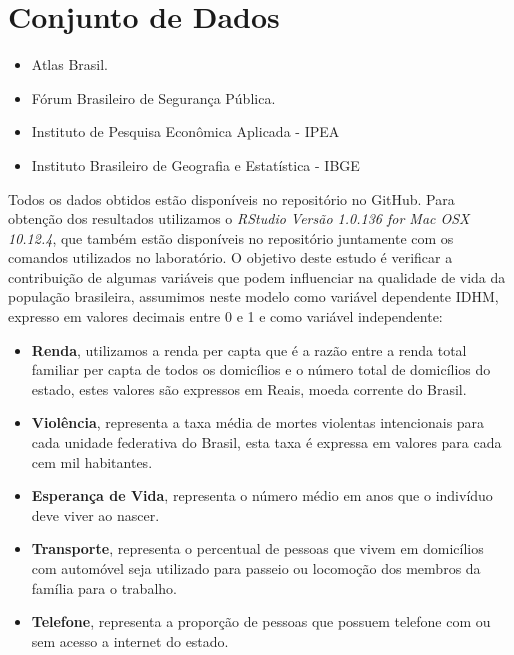 \documentclass[10pt,foldmark,notumble]{leaflet}
\begin{document}
\pagebreak

\section{Conjunto de Dados}

\begin{itemize}
			\item Atlas Brasil.
            \item Fórum Brasileiro de Segurança Pública.
            \item Instituto de Pesquisa Econômica Aplicada - IPEA
            \item Instituto Brasileiro de Geografia e Estatística - IBGE
		\end{itemize} 
        

Todos os dados obtidos estão disponíveis no repositório\cite{RepoIgor2017} no GitHub. Para obtenção dos resultados utilizamos o \emph{RStudio Versão 1.0.136 for Mac OSX 10.12.4}, que também estão disponíveis no repositório\cite{RepoIgor2017} juntamente com os comandos utilizados no laboratório. O objetivo deste estudo é verificar a contribuição de algumas variáveis que podem influenciar na qualidade de vida da população brasileira, assumimos neste modelo como variável dependente IDHM, expresso em valores decimais entre 0 e 1 e como variável independente:

\begin{itemize}
\item {\textbf{Renda}, utilizamos a renda per capta que é a razão entre a renda total familiar per capta de todos os domicílios e o número total de domicílios do estado, estes valores são expressos em Reais, moeda corrente do Brasil.}
\item {\textbf{Violência}, representa a taxa média de mortes violentas intencionais para cada unidade federativa do Brasil, esta taxa é expressa em valores para cada cem mil habitantes.}
\item {\textbf{Esperança de Vida}, representa o número médio em anos que o indivíduo deve viver ao nascer.}
\item {\textbf{Transporte}, representa o percentual de pessoas que vivem em domicílios com automóvel seja utilizado para passeio ou locomoção dos membros da família para o trabalho.}
\item {\textbf{Telefone}, representa a proporção de pessoas que possuem telefone com ou sem acesso a internet do estado.}
\end{itemize}
\end{document}
